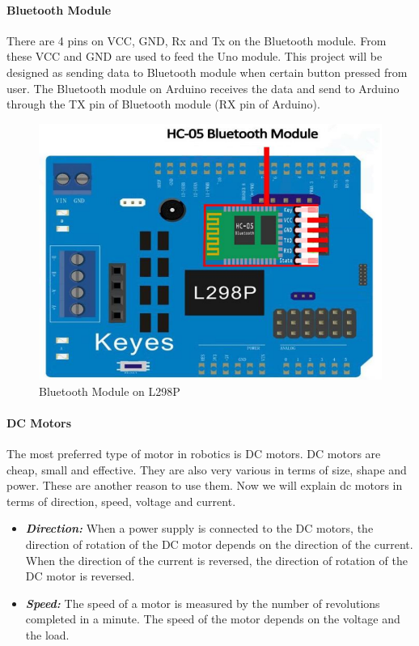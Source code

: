 \documentclass[11pt]{article}
\begin{document}
\pagebreak

\paragraph{Bluetooth Module}
\begin{flushleft}
There are 4 pins on VCC, GND, Rx and Tx on the Bluetooth module. From these VCC and GND are used to feed the Uno module. This project will be designed as sending data to Bluetooth module when certain button pressed from user. The Bluetooth module on Arduino receives the data and send to Arduino through the TX pin of Bluetooth module (RX pin of Arduino).
\end{flushleft}
\begin{figure}[h]
\centering
\includegraphics[scale=0.30]{blue.png}
\caption{Bluetooth Module on L298P}
\end{figure}

\vspace{0.2cm}

\paragraph{DC Motors}
\begin{flushleft}
The most preferred type of motor in robotics is DC motors. DC motors are cheap, small and effective. They are also very various in terms of size, shape and power. These are another reason to use them. Now we will explain dc motors in terms of direction, speed, voltage and current.
\end{flushleft}
\begin{itemize}
\item[] \textbf{\textit{Direction:}} When a power supply is connected to the DC motors, the direction of rotation of the DC motor depends on the direction of the current. When the direction of the current is reversed, the direction of rotation of the DC motor is reversed.

\item[] \textbf{\textit{Speed:}} The speed of a motor is measured by the number of revolutions completed in a minute. The
speed of the motor depends on the voltage and the load.
\end{itemize}
\end{document}
